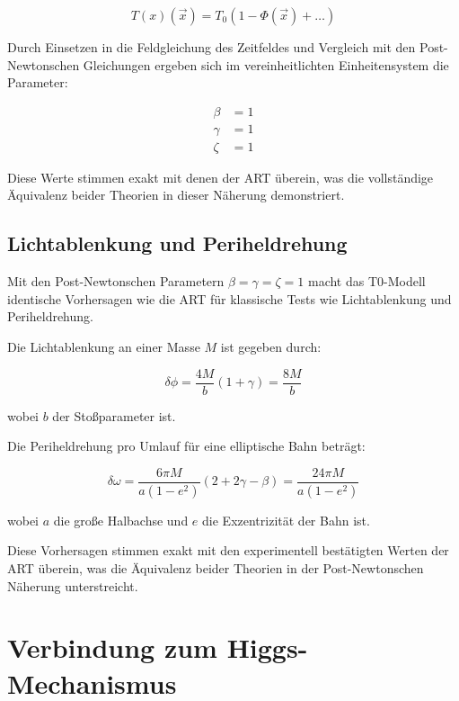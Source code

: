 \documentclass[12pt,a4paper]{article}
\newcommand{\Tfield}{T(x)}
\newcommand{\Tzero}{T_0}
\newcommand{\vecx}{\vec{x}}
\begin{document}
	\begin{equation}
		\Tfield(\vecx) = \Tzero(1 - \Phi(\vecx) + \dots)
	\end{equation}
	
	Durch Einsetzen in die Feldgleichung des Zeitfeldes und Vergleich mit den Post-Newtonschen Gleichungen ergeben sich im vereinheitlichten Einheitensystem die Parameter:
	
	\begin{align}
		\beta &= 1 \\
		\gamma &= 1 \\
		\zeta &= 1
	\end{align}
	
	Diese Werte stimmen exakt mit denen der ART überein, was die vollständige Äquivalenz beider Theorien in dieser Näherung demonstriert.
	
	\subsection{Lichtablenkung und Periheldrehung}
	Mit den Post-Newtonschen Parametern \(\beta = \gamma = \zeta = 1\) macht das T0-Modell identische Vorhersagen wie die ART für klassische Tests wie Lichtablenkung und Periheldrehung.
	
	Die Lichtablenkung an einer Masse \(M\) ist gegeben durch:
	
	\begin{equation}
		\delta\phi = \frac{4M}{b}(1 + \gamma) = \frac{8M}{b}
	\end{equation}
	
	wobei \(b\) der Stoßparameter ist.
	
	Die Periheldrehung pro Umlauf für eine elliptische Bahn beträgt:
	
	\begin{equation}
		\delta\omega = \frac{6\pi M}{a(1-e^2)}(2 + 2\gamma - \beta) = \frac{24\pi M}{a(1-e^2)}
	\end{equation}
	
	wobei \(a\) die große Halbachse und \(e\) die Exzentrizität der Bahn ist.
	
	Diese Vorhersagen stimmen exakt mit den experimentell bestätigten Werten der ART überein, was die Äquivalenz beider Theorien in der Post-Newtonschen Näherung unterstreicht.
	
	\section{Verbindung zum Higgs-Mechanismus}
	
\end{document}
